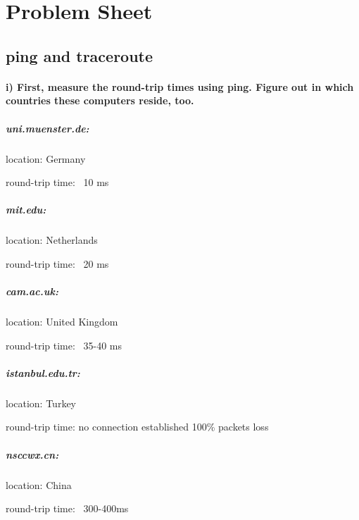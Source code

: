 \documentclass[a4paper,12pt]{article}
\begin{document}
    
    \section{Problem Sheet}
    \subsection{ping and traceroute}
    
    \paragraph{i) First, measure the round-trip times using ping. Figure out in which countries
                these computers reside, too.}
    
    \subparagraph{uni.muenster.de:}
    \begin{description}[font=$\bullet$~\normalfont\scshape]
    \item location: Germany
    \item round-trip time: ~10 ms
    \end{description}

    \subparagraph{mit.edu:}
    \begin{description}[font=$\bullet$~\normalfont\scshape]
    \item location: Netherlands
    \item round-trip time: ~20 ms
    \end{description}

    \subparagraph{cam.ac.uk:}
    \begin{description}[font=$\bullet$~\normalfont\scshape]
    \item location: United Kingdom
    \item round-trip time: ~35-40 ms
    \end{description}

    \subparagraph{istanbul.edu.tr:}
    \begin{description}[font=$\bullet$~\normalfont\scshape]
    \item location: Turkey
    \item round-trip time: no connection established 100\% packets loss
    \end{description}

    \subparagraph{nsccwx.cn:}
    \begin{description}[font=$\bullet$~\normalfont\scshape]
    \item location: China
    \item round-trip time: ~300-400ms
    \end{description}
\end{document}
